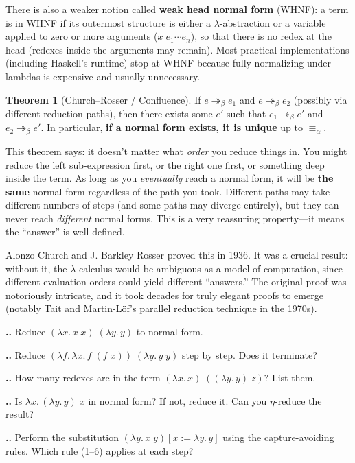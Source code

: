 \documentclass[11pt,a4paper]{article}
\newcounter{exercise}[section]
\renewcommand{\theexercise}{\thesection.\arabic{exercise}}
\theoremstyle{definition}
\newtheorem{theorem}[definition]{Theorem}
\newcommand{\lam}{\lambda}
\newcommand{\reduces}{\twoheadrightarrow_\beta}
\newcommand{\aeq}{\equiv_\alpha}
\begin{document}
There is also a weaker notion called \textbf{weak head normal form} (WHNF): a
term is in WHNF if its outermost structure is either a $\lam$-abstraction or a
variable applied to zero or more arguments ($x\;e_1\cdots e_n$), so that there
is no redex at the head (redexes inside the arguments may remain). Most practical implementations
(including Haskell's runtime) stop at WHNF because fully normalizing under
lambdas is expensive and usually unnecessary.

\begin{theorem}[Church--Rosser / Confluence]
If $e \reduces e_1$ and $e \reduces e_2$ (possibly via different reduction
paths), then there exists some $e'$ such that $e_1 \reduces e'$ and
$e_2 \reduces e'$. In particular, \textbf{if a normal form exists, it is
unique} up to $\aeq$.
\end{theorem}

\begin{intuition}
This theorem says: it doesn't matter what \emph{order} you reduce things in.
You might reduce the left sub-expression first, or the right one first, or
something deep inside the term. As long as you \emph{eventually} reach a normal
form, it will be \textbf{the same} normal form regardless of the path you took.
Different paths may take different numbers of steps (and some paths may diverge
entirely), but they can never reach \emph{different} normal forms. This is a
very reassuring property---it means the ``answer'' is well-defined.

Alonzo Church and J. Barkley Rosser proved this in 1936. It was a crucial
result: without it, the $\lam$-calculus would be ambiguous as a model of
computation, since different evaluation orders could yield different ``answers.''
The original proof was notoriously intricate, and it took decades for truly elegant proofs
to emerge (notably Tait and Martin-L\"of's parallel reduction technique in the
1970s).
\end{intuition}

\begin{exercisebox}
\textbf{\theexercise.}\; Reduce $(\lam x.\, x\;x)\;(\lam y.\, y)$ to normal form.

\textbf{\theexercise.}\; Reduce $(\lam f.\, \lam x.\, f\;(f\;x))\;(\lam y.\, y\;y)$ step by step. Does it terminate?

\textbf{\theexercise.}\; How many redexes are in the term $(\lam x.\, x)\;((\lam y.\, y)\;z)$? List them.

\textbf{\theexercise.}\; Is $\lam x.\, (\lam y.\, y)\;x$ in normal form? If not, reduce it. Can you $\eta$-reduce the result?

\textbf{\theexercise.}\; Perform the substitution $(\lam y.\, x\;y)[x := \lam y.\, y]$ using the capture-avoiding rules. Which rule (1--6) applies at each step?
\end{exercisebox}
\end{document}

